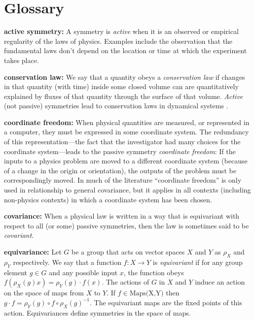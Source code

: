 \documentclass{article}
\theoremstyle{plain}
\theoremstyle{definition}
\theoremstyle{remark}
\begin{document}

{\raggedright


}

\newpage\appendix\onecolumn
\section{Glossary}
\textbf{active symmetry:}
A symmetry is \emph{active} when it is an observed or empirical regularity of the laws of physics.
Examples include the observation that the fundamental laws don't depend on the location or time at which the experiment takes place.

\textbf{conservation law:}
We say that a quantity obeys a \emph{conservation law} if changes in that quantity (with time) inside some closed volume can are quantitatively explained by fluxes of that quantity through the surface of that volume.
\emph{Active} (not passive) symmetries lead to conservation laws in dynamical systems \cite{noether}.

\textbf{coordinate freedom:}
When physical quantities are measured, or represented in a computer, they must be expressed in some coordinate system.
The redundancy of this representation---the fact that the investigator had many choices for the coordinate system---leads to the passive symmetry \emph{coordinate freedom}:
If the inputs to a physics problem are moved to a different coordinate system (because of a change in the origin or orientation), the outputs of the problem must be correspondingly moved.
In much of the literature ``coordinate freedom'' is only used in relationship to general covariance, but it applies in all contexts (including non-physics contexts) in which a coordinate system has been chosen.

\textbf{covariance:}
When a physical law is written in a way that is equivariant with respect to all (or some) passive symmetries, then the law is sometimes said to be \emph{covariant}.

\textbf{equivariance:}
Let $G$ be a group that acts on vector spaces $X$ and $Y$ as $\rho_X$ and $\rho_Y$ respectively. We say that a function $f:X\to Y$ is \emph{equivariant} if for any group element $g\in G$ and any possible input $x$, the function obeys $f( \rho_X(g) x) = \rho_Y(g)\cdot f(x)$.
The actions of $G$ in $X$ and $Y$ induce an action on the space of maps from $X$ to $Y$. If $f\in \text{Maps(X,Y)}$ then $g\cdot f = \rho_Y(g)\circ f \circ \rho_X(g)^{-1}$.
The equivariant maps are the fixed points of this action.
Equivariances define symmetries in the space of maps. 
\end{document}
